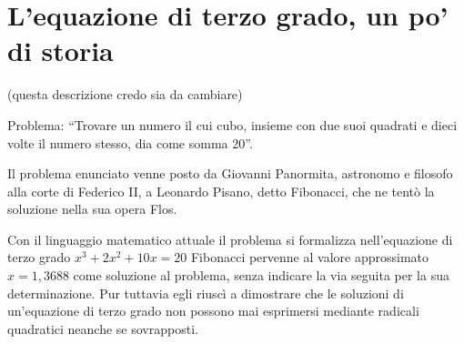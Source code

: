 % 
% 
% 
% 
% 
% 


\section{L'equazione di terzo grado, un po' di storia}
\label{sec:eq2gr_gradosup}(questa descrizione credo sia da cambiare)

Problema: ``Trovare un numero il cui cubo, insieme con due suoi quadrati e dieci 
volte il numero stesso, dia come somma 20''.

Il problema enunciato venne posto da Giovanni Panormita, astronomo e filosofo 
alla corte di Federico II, a Leonardo Pisano, detto Fibonacci, che ne tentò la 
soluzione nella sua opera Flos.

Con il linguaggio matematico attuale il problema si formalizza nell'equazione di 
terzo grado $x^3+2x^2+10x=20$ Fibonacci pervenne al valore approssimato 
$x=1,3688$ come soluzione al problema, senza indicare la via seguita per la sua 
determinazione. Pur tuttavia egli riuscì a dimostrare che le soluzioni di 
un'equazione di terzo grado non possono mai esprimersi mediante radicali 
quadratici neanche se sovrapposti.


